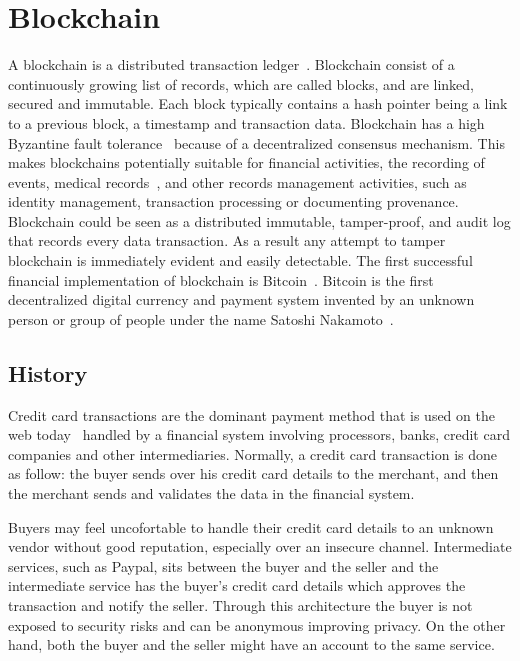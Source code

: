\chapter{Blockchain}
\label{blockchain}

A blockchain is a distributed transaction ledger~\cite{nakamoto2012bitcoin}.
Blockchain consist of a continuously growing list of records, which are called blocks, and are linked, secured and immutable.
Each block typically contains a hash pointer being a link to a previous block, a timestamp and transaction data. Blockchain has a high Byzantine fault tolerance~\cite{byzantine_fault_tolerance} because of a decentralized consensus mechanism.
This makes blockchains potentially suitable for financial activities, the recording of events, medical records~\cite{blockchain_ehr,Azaria2016}, and other records management activities, such as identity management, transaction processing or documenting provenance. Blockchain could be seen as a distributed immutable, tamper-proof,
and audit log that records every data transaction. As a result any attempt to tamper blockchain is immediately evident and easily detectable.
The first successful financial implementation of blockchain is Bitcoin~\cite{nakamoto2012bitcoin}.
Bitcoin is the first decentralized digital currency and payment system invented by an unknown person or group of people under the name Satoshi Nakamoto~\cite{nakamoto2012bitcoin}.

\section{History}\label{blockchain:history}

Credit card transactions are the dominant payment method that is used on the web today~\cite{Narayanan:2016:BCT:2994437} handled by a financial
system involving processors, banks, credit card companies and other intermediaries. Normally, a credit card transaction is done as follow:
the buyer sends over his credit card details to the merchant, and then the merchant sends and validates the data in the financial system.

Buyers may feel uncofortable to handle their credit card details to an unknown vendor without good reputation, especially over an insecure channel.
Intermediate services, such as Paypal, sits between the buyer and the seller and the intermediate service has the buyer's credit card details which approves
the transaction and notify the seller. Through this architecture the buyer is not exposed to security risks and can be anonymous improving privacy. On the other hand,
both the buyer and the seller might have an account to the same service.

